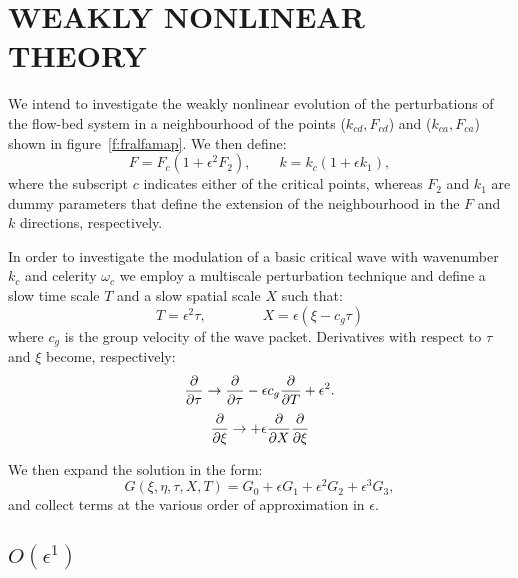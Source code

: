 \documentclass[12pt,a4paper,twocolumn,fleqn]{narms}
\begin{document}
\section{WEAKLY NONLINEAR THEORY}
\label{wnltheory}

We intend to investigate the weakly nonlinear evolution of the
perturbations of the flow-bed system in a neighbourhood of the points
($k_{cd}, F_{cd}$) and ($k_{ca}, F_{ca}$) shown in
figure~\ref{f:fralfamap}. We then define:
\begin{equation}
F=F_c (1 + \epsilon^2 F_2), \qquad k=k_c (1 + \epsilon k_1),
\label{frweak}
\end{equation}
where the subscript $c$ indicates either of the critical points,
whereas $F_2$ and $k_1$ are dummy parameters that define the extension
of the neighbourhood in the $F$ and $k$ directions, respectively.

In order to investigate the modulation of a basic critical wave with
wavenumber $k_c$ and celerity $\omega_c$ we employ a multiscale
perturbation technique and define a slow time scale $T$ and a slow
spatial scale $X$ such that:
\begin{equation}
T = \epsilon^2 \tau, \qquad \qquad
X = \epsilon (\xi - c_g \tau)
\end{equation}
where $c_g$ is the group velocity of the wave packet. Derivatives with
respect to $\tau$ and $\xi$ become, respectively:
\begin{equation}
\frac{{\rm \partial} {}}{{\rm \partial} \tau} \rightarrow
\frac{{\rm \partial} {}}{{\rm \partial} \tau} - \epsilon c_g
\frac{{\rm \partial} {}}{{\rm \partial} T}  + \epsilon^2.
\end{equation}
\begin{equation}
\frac{{\rm \partial} {}}{{\rm \partial} \xi} \rightarrow  +
\epsilon \frac{{\rm \partial} {}}{{\rm
\partial} X}
\frac{{\rm
\partial} {}}{{\rm \partial} \xi}
\end{equation}

We then expand the solution in the form:
\begin{equation}
G(\xi, \eta, \tau, X, T) = G_0 + \epsilon G_1 + \epsilon^2 G_2 +
\epsilon^3 G_3,
\label{expansion}
\end{equation}
and collect terms at the various order of approximation in $\epsilon$.

\subsection{$O(\epsilon^1)$}
\end{document}
